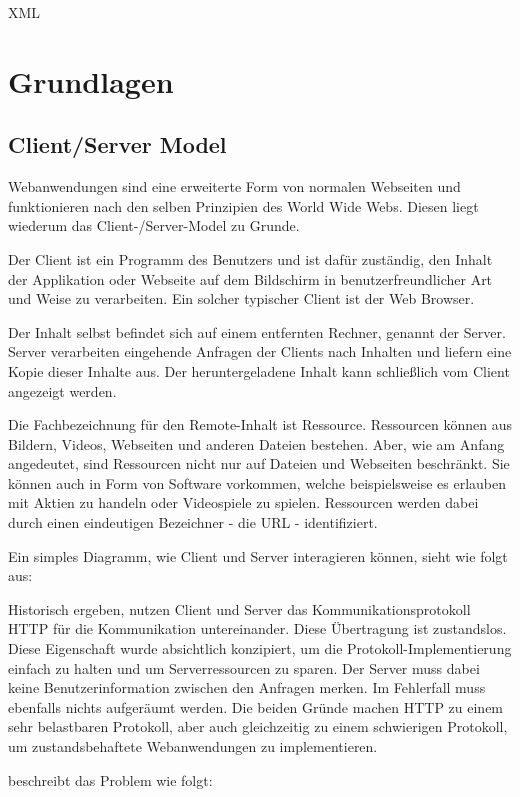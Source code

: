 XML\chapter{Grundlagen}

\section{Client/Server Model}
\label{sec:client_server}

Webanwendungen sind eine erweiterte Form von normalen Webseiten und funktionieren nach den selben Prinzipien des World Wide Webs. Diesen liegt wiederum das Client-/Server-Model zu Grunde.

Der Client ist ein Programm des Benutzers und ist dafür zuständig, den Inhalt der Applikation oder Webseite auf dem Bildschirm in benutzerfreundlicher Art und Weise zu verarbeiten. Ein solcher typischer Client ist der Web Browser.

Der Inhalt selbst befindet sich auf einem entfernten Rechner, genannt der Server. Server verarbeiten eingehende Anfragen der Clients nach Inhalten und liefern eine Kopie dieser Inhalte aus. Der heruntergeladene Inhalt kann schließlich vom Client angezeigt werden.

Die Fachbezeichnung für den Remote-Inhalt ist Ressource. Ressourcen können aus Bildern, Videos, Webseiten und anderen Dateien bestehen. Aber, wie am Anfang angedeutet, sind Ressourcen nicht nur auf Dateien und Webseiten beschränkt. Sie können auch in Form von Software vorkommen, welche beispielsweise es erlauben mit Aktien zu handeln oder Videospiele zu spielen. Ressourcen werden dabei durch einen eindeutigen Bezeichner - die URL - identifiziert.

Ein simples Diagramm, wie Client und Server interagieren können, sieht wie folgt aus:

Historisch ergeben, nutzen Client und Server das Kommunikationsprotokoll HTTP für die Kommunikation untereinander. Diese Übertragung ist zustandslos. Diese Eigenschaft wurde absichtlich konzipiert, um die Protokoll-Implementierung einfach zu halten und um Serverressourcen zu sparen. Der Server muss dabei keine Benutzerinformation zwischen den Anfragen merken. Im Fehlerfall muss ebenfalls nichts aufgeräumt werden. Die beiden Gründe machen HTTP zu einem sehr belastbaren Protokoll, aber auch gleichzeitig zu einem schwierigen Protokoll, um zustandsbehaftete Webanwendungen zu implementieren.

\cite[Background]{Parikh:2015} beschreibt das Problem wie folgt:

